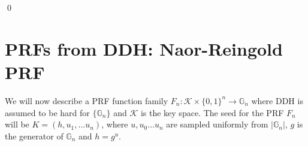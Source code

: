 \qed







\section{PRFs from DDH: Naor-Reingold PRF}
We will now describe a PRF function family $F_n: \mathcal{K} \times \{0,1\}^n \rightarrow \mathbb{G}_n$ where DDH is assumed to be hard for  $\{\mathbb{G}_n\}$ and $\mathcal{K}$ is the key space.
The seed for the PRF $F_n$ will be $K =  (h, u_1, \ldots u_n)$, where $u,u_0\ldots u_n$ are sampled uniformly from $|\mathbb{G}_n|$, $g$ is the generator of $\mathbb{G}_n$ and $h = g^u$.

